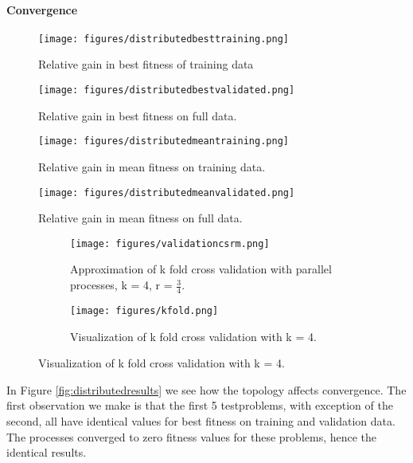 \paragraph{Convergence}
\begin{figure*}
    \centering
    \begin{subfigure}{0.5\textwidth}
    \centering
        \texttt{[image: figures/distributedbesttraining.png]}
        \caption{Relative gain in best fitness of training data}
    \end{subfigure}%
    \begin{subfigure}{0.5\textwidth}
    \centering
        \texttt{[image: figures/distributedbestvalidated.png]}
        \caption{Relative gain in best fitness on full data.}
    \end{subfigure}
        \begin{subfigure}{0.5\textwidth}
    \centering
        \texttt{[image: figures/distributedmeantraining.png]}
        \caption{Relative gain in mean fitness on training data.}
    \end{subfigure}%
    \begin{subfigure}{0.5\textwidth}
    \centering
        \texttt{[image: figures/distributedmeanvalidated.png]}
        \caption{Relative gain in mean fitness on full data.}
    \end{subfigure}
    \caption{Convergence differences between topologies.}
    \label{fig:distributedresults}
\end{figure*}
\begin{figure}
	\begin{subfigure}{0.5\textwidth}\label{fig:csrmkfold}
    \texttt{[image: figures/validationcsrm.png]}
    \caption{Approximation of k fold cross validation with parallel processes, k = 4,  r = $\frac{3}{4}$.}
    \end{subfigure}
	\begin{subfigure}{0.5\textwidth}    \label{fig:kfold}

    \centering
    \texttt{[image: figures/kfold.png]}
    \caption{Visualization of k fold cross validation with k = 4.}
    \end{subfigure}%
    \label{fig:ckfold}
 \end{figure}
In Figure \ref{fig:distributedresults} we see how the topology affects convergence. The first observation we make is that the first 5 testproblems, with exception of the second, all have identical values for best fitness on training and validation data. The processes converged to zero fitness values for these problems, hence the identical results. 
